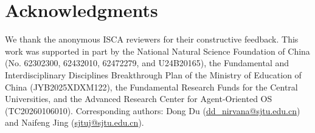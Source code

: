 \section*{Acknowledgments}  
We thank the anonymous ISCA reviewers for their constructive feedback.
This work was supported in part by the National Natural Science Foundation of China (No. 62302300, 62432010, 62472279, and U24B20165), 
the Fundamental and Interdisciplinary Disciplines Breakthrough Plan of the Ministry of Education of China (JYB2025XDXM122),
the Fundamental Research Funds for the Central Universities,
and the Advanced Research Center for Agent-Oriented OS (TC20260106010).
Corresponding authors: Dong Du (\url{dd\_nirvana@sjtu.edu.cn}) and Naifeng Jing (\url{sjtuj@sjtu.edu.cn}).
